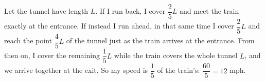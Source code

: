 Let the tunnel have length $L$. If I run back, I cover $\dfrac{2}{5}L$ and meet the train exactly at the entrance. If instead I run ahead, in that same time I cover $\dfrac{2}{5}L$ and reach the point $\dfrac{4}{5}L$ of the tunnel just as the train arrives at the entrance. From then on, I cover the remaining $\dfrac{1}{5}L$ while the train covers the whole tunnel $L$, and we arrive together at the exit. So my speed is $\dfrac{1}{5}$ of the train's: $\dfrac{60}{5}=\boxed{12}$ mph.
